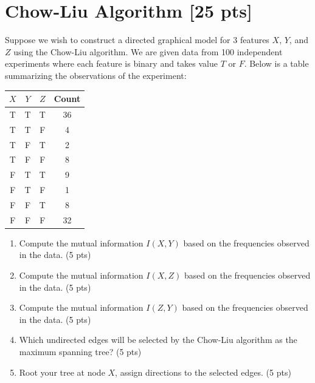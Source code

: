 \documentclass[a4paper]{article}
\theoremstyle{definition}
\begin{document}
\section{Chow-Liu Algorithm [25 pts]}
Suppose we wish to construct a directed graphical model for 3 features $X$, $Y$, and $Z$ using the Chow-Liu algorithm. We are given data from 100 independent experiments where each feature is binary and takes value $T$ or $F$. Below is a table summarizing the observations of the experiment:

\begin{table}[H]
	\centering
	\begin{tabular}{cccc}
		$X$ & $Y$ & $Z$ & Count \\
		\hline
		T   & T   & T   & 36    \\
		\hline
		T   & T   & F   & 4     \\
		\hline
		T   & F   & T   & 2     \\
		\hline
		T   & F   & F   & 8     \\
		\hline
		F   & T   & T   & 9     \\
		\hline
		F   & T   & F   & 1     \\
		\hline
		F   & F   & T   & 8     \\
		\hline
		F   & F   & F   & 32    \\
		\hline
	\end{tabular}
\end{table}

\begin{enumerate}
	\item Compute the mutual information $I(X, Y)$ based on the frequencies observed in the data. (5 pts)
	\item Compute the mutual information $I(X, Z)$ based on the frequencies observed in the data. (5 pts)
	\item Compute the mutual information $I(Z, Y)$ based on the frequencies observed in the data. (5 pts)
	\item Which undirected edges will be selected by the Chow-Liu algorithm as the maximum spanning tree? (5 pts)
	\item Root your tree at node $X$, assign directions to the selected edges. (5 pts)
\end{enumerate}



\end{document}
